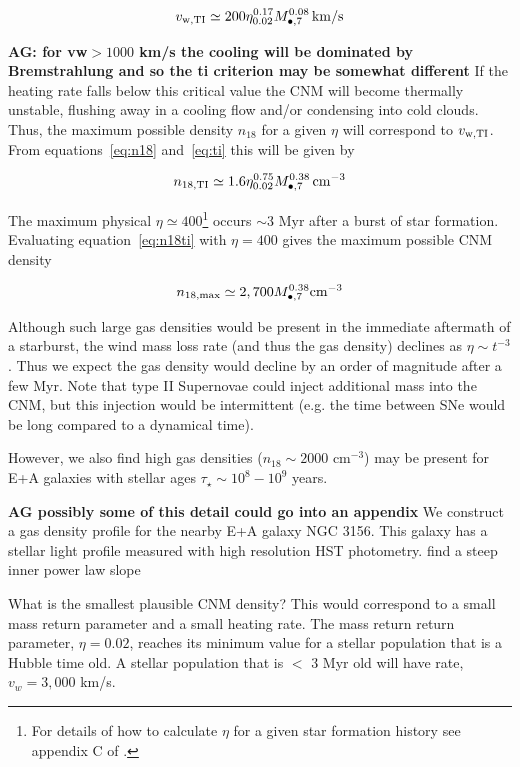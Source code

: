 \documentclass[usenatbib,fleqn]{mn2e}
\newcommand{\Mbh}[1][]{M_{\bullet#1}}
\begin{document}
\begin{equation}
v_{\rm w,TI}\simeq 200 \eta_{0.02}^{0.17} \Mbh[,7]^{0.08} \,{\rm km/s} 
\label{eq:ti}
\end{equation}

{\bf AG: for vw$>1000$ km/s the cooling will be dominated by
  Bremstrahlung and so the ti criterion may be somewhat different} If
the heating rate falls below this critical value the CNM will become
thermally unstable, flushing away in a cooling flow and/or condensing
into cold clouds. Thus, the maximum possible density $n_{18}$ for
a given $\eta$ will correspond to $v_{\rm w,TI}$. From
equations~\eqref{eq:n18} and~\eqref{eq:ti} this will be given by

\begin{equation}
n_{\rm 18,TI}\simeq 1.6 \eta_{0.02}^{0.75} \Mbh[,7]^{0.38} \, {\rm cm^{-3}}
\label{eq:n18ti}
\end{equation}

The maximum physical $\eta\simeq 400$\footnote{For details
  of how to calculate $\eta$ for a given star formation history see
  appendix C of \citet{Generozov+2015}.} occurs $\sim 3$ Myr after a
burst of star formation. Evaluating equation~\eqref{eq:n18ti} with
$\eta=400$ gives the maximum possible CNM density

\begin{equation}
n_{\rm 18,max} \simeq 2,700 \Mbh[,7]^{0.38} {\rm cm^{-3}}
\label{eq:n18max}
\end{equation}

Although such large gas densities would be present in the immediate
aftermath of a starburst, the wind mass loss rate (and thus the gas
density) declines as $\eta \sim t^{-3}$. Thus we expect the gas density would
decline by an order of magnitude after a few Myr. Note that type II
Supernovae could inject additional mass into the CNM, but this
injection would be intermittent (e.g. the time between SNe would be
long compared to a dynamical time).

However, we also find high gas densities ($n_{18}\sim 2000$ cm$^{-3}$)
may be present for E+A galaxies with stellar ages $\tau_\star\sim
10^8-10^9$ years.  

{\bf AG possibly some of this detail could go into an appendix} We
construct a gas density profile for the nearby E+A galaxy NGC
3156. This galaxy has a stellar light profile measured with high
resolution HST photometry. \citealt{Krajnovic+2013} find a steep inner
power law slope 

What is the smallest plausible CNM density? This would correspond to a
small mass return parameter and a small heating rate. The mass return
return parameter, $\eta=0.02$, reaches its minimum value for a stellar
population that is a Hubble time old. A stellar population
that is $<$ 3 Myr old will have rate, $v_w=3,000$ km/s.
\end{document}
